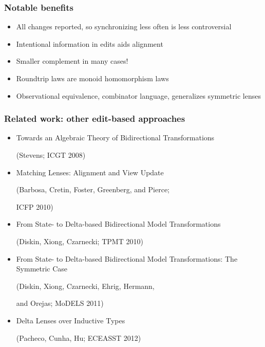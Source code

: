 \documentclass[14pt]{beamer}
\begin{document}
\begin{frame}
    \frametitle{Notable benefits}
    \begin{itemize}
        \item All changes reported, so synchronizing less often is less controversial
        \item Intentional information in edits aids alignment
        \item Smaller complement in many cases!
        \item Roundtrip laws are monoid homomorphism laws
            \pause
        \item Observational equivalence, combinator language, generalizes
            symmetric lenses
    \end{itemize}
\end{frame}

\begin{frame}
    \frametitle{Related work: other edit-based approaches}
    \begin{itemize}
        \small
        \item Towards an Algebraic Theory of Bidirectional Transformations

            \quad (Stevens; ICGT 2008)
        \item Matching Lenses: Alignment and View Update

            \quad (Barbosa, Cretin, Foster, Greenberg, and Pierce;

            \quad ICFP 2010)
        \item From State- to Delta-based Bidirectional Model Transformations

            \quad (Diskin, Xiong, Czarnecki; TPMT 2010)
        \item From State- to Delta-based Bidirectional Model
            Transformations: The Symmetric Case

            \quad (Diskin, Xiong, Czarnecki, Ehrig, Hermann,

            \quad and Orejas; MoDELS 2011)
        \item Delta Lenses over Inductive Types

            \quad (Pacheco, Cunha, Hu; ECEASST 2012)
    \end{itemize}
\end{frame}

\end{document}
